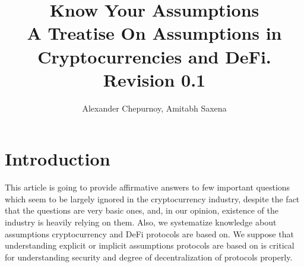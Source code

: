 \documentclass{article}   %
\begin{document}
\title{Know Your Assumptions \\
\small A Treatise On Assumptions in Cryptocurrencies and DeFi. \\
\small Revision 0.1
}
\author{Alexander Chepurnoy, Amitabh Saxena}


\maketitle

\begin{abstract}
\end{abstract}

\section{Introduction}

This article is going to provide affirmative answers to few important 
questions which seem to be largely ignored in the cryptocurrency industry, despite the fact 
that the questions are very basic ones, and, in our opinion, existence of the industry is heavily relying on them. 
Also, we systematize knowledge about assumptions cryptocurrency and DeFi protocols are based on. We suppose that understanding explicit or implicit assumptions
 protocols are based on is critical for understanding security and degree of decentralization of protocols properly.
\end{document}
